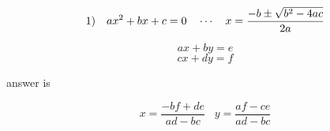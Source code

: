 \documentclass[uplatex]{jsarticle}
\begin{document}
$$\LARGE{ 1) \hspace{10pt} ax^2+bx+c = 0\hspace{10pt}\cdots \hspace{10pt} x = \frac{-b\pm\sqrt{b^2-4ac}}{2a}}$$

$$ ax + by = e $$
$$ cx + dy = f $$

answer is

$$ x = \frac{ - bf + de}{ad -bc} \hspace{10pt} y = \frac{af-ce}{ad-bc} $$
\end{document}
